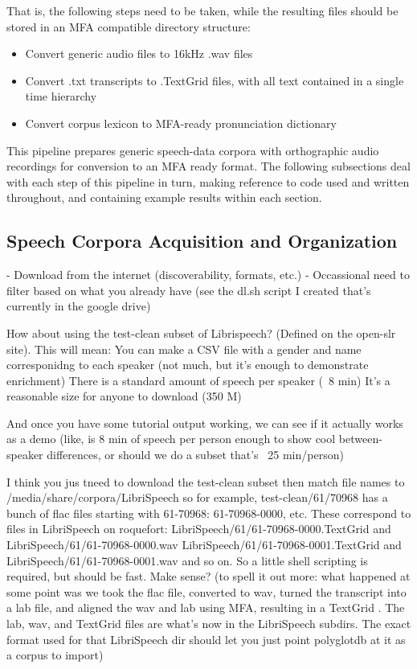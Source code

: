 \documentclass[11pt]{article}
\begin{document}
That is, the following steps need to be taken, while the resulting files should be stored in an MFA compatible directory structure:

\begin{singlespace}
\begin{itemize}
  \item Convert generic audio files to 16kHz .wav files
  \item Convert .txt transcripts to .TextGrid files, with all text contained in a single time hierarchy 
  \item Convert corpus lexicon to MFA-ready pronunciation dictionary
\end{itemize}
\end{singlespace}

This pipeline prepares generic speech-data corpora with orthographic audio recordings for conversion to an MFA ready format. The following subsections deal with each step of this pipeline in turn, making reference to code used and written throughout, and containing example results within each section.

\subsection{Speech Corpora Acquisition and Organization}

- Download from the internet (discoverability, formats, etc.)
- Occassional need to filter based on what you already have (see the dl.sh script I created that's currently in the google drive)

How about using the test-clean subset of Librispeech? (Defined on the open-slr site). This will mean:
You can make a CSV file with a gender and name corresponidng to each speaker (not much, but it's enough to demonstrate enrichment)
There is a standard amount of speech per speaker (~8 min)
It's a reasonable size for anyone to download (350 M)

And once you have some tutorial output working, we can see if it actually works as a demo (like, is 8 min of speech per person enough to show cool between-speaker differences, or should we do a subset that's ~25 min/person)

I think you jus tneed to download the test-clean subset
then match file names to /media/share/corpora/LibriSpeech
so for example, test-clean/61/70968 has a bunch of flac files starting with 61-70968: 61-70968-0000, etc.
These correspond to files in LibriSpeech on roquefort:
LibriSpeech/61/61-70968-0000.TextGrid and LibriSpeech/61/61-70968-0000.wav
 LibriSpeech/61/61-70968-0001.TextGrid and LibriSpeech/61/61-70968-0001.wav
and so on.  So a little shell scripting is required, but should be fast.  Make sense?
(to spell it out more: what happened at some point was we took the flac file, converted to wav, turned the transcript into a lab file, and aligned the wav and lab using MFA, resulting in a TextGrid .  The lab, wav, and TextGrid files are what's now in the LibriSpeech subdirs. The exact format used for that LibriSpeech dir should let you just point polyglotdb at it as a corpus to import)
\end{document}

